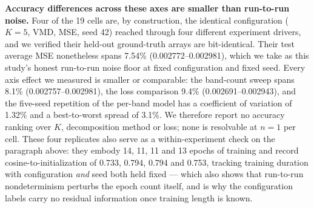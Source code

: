 \documentclass[journal]{IEEEtran}
\begin{document}
\textbf{Accuracy differences across these axes are smaller than run-to-run noise.}
Four of the 19 cells are, by construction, the identical configuration ($K=5$,
VMD, MSE, seed 42) reached through four different experiment drivers, and we
verified their held-out ground-truth arrays are bit-identical. Their test average
MSE nonetheless spans 7.54\% (0.002772--0.002981), which we take as this study's
honest run-to-run noise floor at fixed configuration and fixed seed. Every axis
effect we measured is smaller or comparable: the band-count sweep spans 8.1\%
(0.002757--0.002981), the loss comparison 9.4\% (0.002691--0.002943), and the
five-seed repetition of the per-band model has a coefficient of variation of
1.32\% and a best-to-worst spread of 3.1\%. We therefore report no accuracy
ranking over $K$, decomposition method or loss; none is resolvable at $n=1$ per
cell. These four replicates also serve as a within-experiment check on the
paragraph above: they embody 14, 11, 11 and 13 epochs of training and record
cosine-to-initialization of 0.733, 0.794, 0.794 and 0.753, tracking training
duration with configuration \emph{and} seed both held fixed --- which also shows
that run-to-run nondeterminism perturbs the epoch count itself, and is why the
configuration labels carry no residual information once training length is known.
\end{document}
